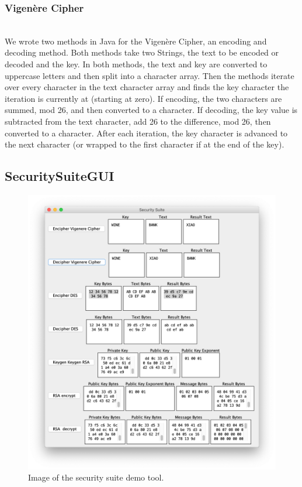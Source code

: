 \documentclass[acmlarge]{acmart}
\begin{document}
\subsubsection{Vigen\`{e}re Cipher}
\hspace*{\fill} \\ %
We wrote two methods in Java for the Vigen\`{e}re Cipher, an encoding and decoding method. Both methods take two Strings, the text to be encoded or decoded and the key. In both methods, the text and key are converted to uppercase letters and then split into a character array. Then the methods iterate over every character in the text character array and finds the key character the iteration is currently at (starting at zero). If encoding, the two characters are summed, mod 26, and then converted to a character. If decoding, the key value is subtracted from the text character, add 26 to the difference, mod 26, then converted to a character. After each iteration, the key character is advanced to the next character (or wrapped to the first character if at the end of the key).

\subsection{SecuritySuiteGUI}\label{sec:gui}

\begin{figure}
  \centering
  \includegraphics[scale=0.40]{demo}
  \caption{Image of the security suite demo tool.}
  \label{fig:one}
\end{figure}
\end{document}
